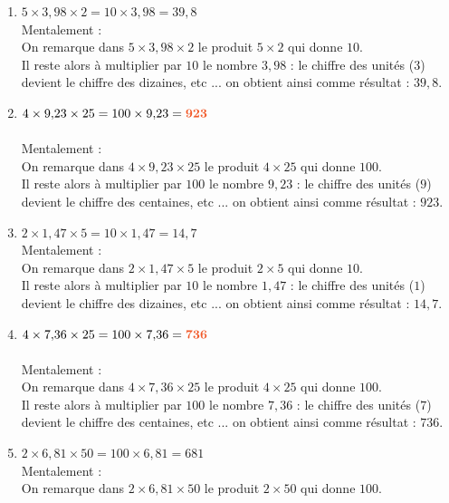 \documentclass[10pt,a4paper]{article}
\begin{document}
\begin{enumerate}[itemsep=1em]
	\item $5 \times 3{,}98\times 2 = 10 \times 3{,}98 = 39{,}8${\color[HTML]{f15929}\\ Mentalement : \\
    On remarque dans $5 \times 3{,}98\times 2$ le produit $5\times 2$ qui donne $10$.\\
    Il reste alors à multiplier par $10$ le nombre $3{,}98$ : le chiffre des unités ($3$) devient le chiffre des dizaines, etc ...
    on obtient ainsi comme résultat : $39{,}8$.
      }
	\item $4 \times 9{,}23\times 25 = 100 \times 9{,}23 = {\color[HTML]{f15929}\boldsymbol{923}}$\\{\color[HTML]{216D9A}\\ Mentalement : \\
  On remarque dans $4 \times 9{,}23\times 25$ le produit $4\times 25$ qui donne $100$.\\
  Il reste alors à multiplier par $100$ le nombre $9{,}23$ : le chiffre des unités ($9$) devient le chiffre des centaines, etc ...
  on obtient ainsi comme résultat : $923$.
    }
	\item $2 \times 1{,}47\times 5 = 10 \times 1{,}47 = 14{,}7${\color[HTML]{f15929}\\ Mentalement : \\
    On remarque dans $2 \times 1{,}47\times 5$ le produit $2\times 5$ qui donne $10$.\\
    Il reste alors à multiplier par $10$ le nombre $1{,}47$ : le chiffre des unités ($1$) devient le chiffre des dizaines, etc ...
    on obtient ainsi comme résultat : $14{,}7$.
      }
	\item $4 \times 7{,}36\times 25 = 100 \times 7{,}36 = {\color[HTML]{f15929}\boldsymbol{736}}$\\{\color[HTML]{216D9A}\\ Mentalement : \\
  On remarque dans $4 \times 7{,}36\times 25$ le produit $4\times 25$ qui donne $100$.\\
  Il reste alors à multiplier par $100$ le nombre $7{,}36$ : le chiffre des unités ($7$) devient le chiffre des centaines, etc ...
  on obtient ainsi comme résultat : $736$.
    }
	\item $2 \times 6{,}81\times 50 = 100 \times 6{,}81 = 681${\color[HTML]{f15929}\\ Mentalement : \\
  On remarque dans $2 \times 6{,}81\times 50$ le produit $2\times 50$ qui donne $100$.\\
}
\end{enumerate}
\end{document}
